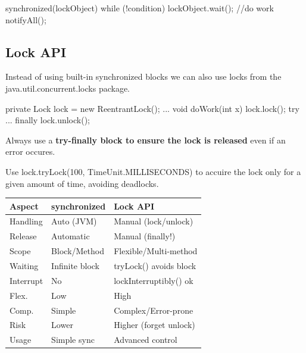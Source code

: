 \begin{codeexample}
synchronized(lockObject) {
    while (!condition) {
        lockObject.wait();
    }
    //do work
    notifyAll();
}
\end{codeexample}

\subsection{Lock API}

Instead of using built-in synchronized blocks we can also use locks from the java.util.concurrent.locks
package.

\begin{codeexample}
private Lock lock = new ReentrantLock();
...
void doWork(int x) {
    lock.lock();
    try {
        ...
    } finally {
        lock.unlock();
    }
}
\end{codeexample}

\begin{important}
Always use a \textbf{try-finally block to ensure the lock is released} even if an error occures.            
\end{important}

\begin{remark}
Use lock.tryLock(100, TimeUnit.MILLISECONDS) to accuire the lock only for
a given amount of time, avoiding deadlocks.
\end{remark}

{\scriptsize
\setlength{\tabcolsep}{2pt}
\begin{tabularx}{\columnwidth}{|l|X|X|}
\hline
Aspect & synchronized & Lock API \\\hline\hline
Handling & Auto (JVM) & Manual (lock/unlock) \\\hline
Release & Automatic & Manual (finally!) \\\hline
Scope & Block/Method & Flexible/Multi-method \\\hline
Waiting & Infinite block & tryLock() avoids block \\\hline
Interrupt & No & lockInterruptibly() ok \\\hline
Flex. & Low & High \\\hline
Comp. & Simple & Complex/Error-prone \\\hline
Risk & Lower & Higher (forget unlock) \\\hline
Usage & Simple sync & Advanced control \\\hline
\end{tabularx}
}

